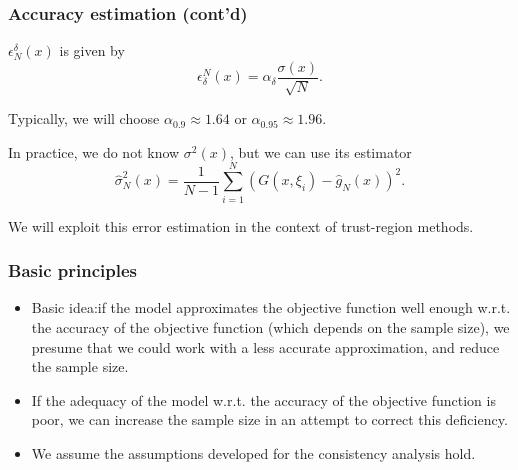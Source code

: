 \documentclass[aspectratio=169]{beamer}
\begin{document}
\begin{frame}
\frametitle{Accuracy estimation (cont'd)}

$\epsilon^{\delta}_N(x)$ is given by
\[
\epsilon_{\delta}^N(x) = \alpha_{\delta} \frac{\sigma(x)}{\sqrt{N}}.
\]

\mbox{}

Typically, we will choose $\alpha_{0.9} \approx 1.64$ or $\alpha_{0.95} \approx 1.96$.

\mbox{}

In practice, we do not know $\sigma^2(x)$, but we can use its estimator
\[
\hat{\sigma}^2_N(x) = \frac{1}{N-1}\sum_{i = 1}^N ( G(x,\xi_i) -
\hat{g}_N(x))^2.
\]

\mbox{}

We will exploit this error estimation in the context of trust-region methods.


\end{frame}

\begin{frame}
\frametitle{Basic principles}

\begin{itemize}
\item
Basic idea:if the model approximates the objective function well enough w.r.t. the accuracy of the objective function (which depends on the sample size), we presume that we could work with a less accurate approximation, and reduce the sample size.
\item
If the adequacy of the model w.r.t. the accuracy of the objective function is poor, we can increase the sample size in an attempt to correct this deficiency.
\item
We assume the assumptions developed for the consistency analysis hold.
\end{itemize}

\end{frame}
\end{document}
